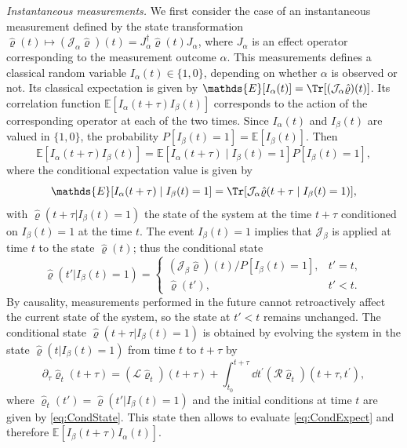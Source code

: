\documentclass[
    11pt,
    letterpaper,
    reprint,
    notitlepage,
    superscriptaddress,
    aps,prx
]{revtex4-2}
\renewcommand{\mathbb}{\mathds}	%
\renewcommand{\rho}{\varrho}
\newcommand{\p}{\partial}
\newcommand{\J}{\mathcal{J}}
\newcommand{\EE}{\mathbb{E}}
\begin{document}
\emph{Instantaneous measurements.}
We first consider the case of an instantaneous measurement defined by
the state transformation $\hat \rho(t) \mapsto 
(\mathcal J_\alpha \hat \rho)(t) = J_\alpha^\dagger \hat \rho(t) J_\alpha $, 
where $J_\alpha$ is an effect operator corresponding to the measurement outcome $\alpha$.
This measurements defines a classical random variable $I_\alpha(t) \in \{1,0\}$, 
depending on whether $\alpha$ is observed or not.
Its classical expectation is given by $\EE[I_\alpha(t)]= \Tr\!\left[(\J_\alpha\hat{\rho})(t)\right]$.
Its correlation function $\EE[I_\alpha(t+ \tau)I_\beta(t)]$ corresponds to the action of 
the corresponding operator at each of the two times. 
Since $I_\alpha(t)$ and $I_\beta(t)$ are valued in $\{1,0\}$, 
the probability $P[I_\beta(t) = 1] = \EE[I_\beta(t)]$.
Then
\begin{equation*}
	\EE[I_\alpha(t + \tau) I_\beta(t)] = \EE[I_\alpha(t+\tau) \mid I_\beta(t) = 1] 
	P[I_\beta(t) = 1],
\end{equation*}
where the conditional expectation value is given by
\begin{equation}\label{eq:CondExpect}
	\EE[I_\alpha(t+\tau) \mid I_\beta(t) = 1] = \Tr[\mathcal J_\alpha 
	\hat \rho(t+\tau\mid I_\beta(t) = 1)],
\end{equation}
with $\hat \rho(t+\tau| I_\beta(t) = 1)$ the state of the system at the time $t+\tau$ 
conditioned on $I_\beta(t) = 1$ at the time $t$.
The event $I_\beta(t) = 1$ implies that $\mathcal J_\beta$ is applied at time $t$ to 
the state $\hat \rho(t)$; thus the conditional state
\begin{equation}\label{eq:CondState}
	\hat \rho(t' | I_\beta(t) = 1) = 
\begin{cases}
	(\mathcal J_\beta \hat \rho)(t)/P[I_\beta(t) = 1], & t' = t,\\
	\hat \rho(t'), & t' < t.
\end{cases}
\end{equation}
By causality, measurements performed in the future cannot retroactively affect the current state 
of the system, so the state at $t' < t$ remains unchanged.
The conditional state $\hat \rho(t+\tau| I_\beta(t) = 1)$ is obtained by evolving the system in the state $\hat \rho(t| I_\beta(t) = 1)$ from time $t$ to $t+\tau$ by
\begin{equation}\label{eq:DiffCorrEq}
	\p_\tau \hat \rho_{t}(t+\tau) = (\mathcal{L}\hat\rho_{t})(t+\tau)
	 + \int_{t_0}^{t+\tau} \dd{t^\prime} (\mathcal{R}\hat \rho_{t})(t+\tau, t^\prime),
\end{equation}
where $\hat \rho_t(t') = \hat \rho(t'| I_\beta (t) = 1)$ and the initial conditions at time 
$t$ are given by \cref{eq:CondState}.
This state then allows to evaluate \cref{eq:CondExpect} and 
therefore $\EE[I_\beta(t+\tau)I_\alpha(t)]$.
\end{document}
